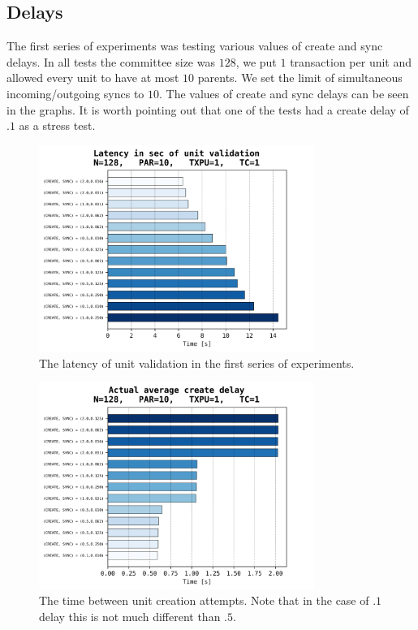 \documentclass[a4paper,10pt]{article}
\begin{document}
		\subsection{Delays}
		\FloatBarrier
			The first series of experiments was testing various values of create and sync delays.
			In all tests the committee size was $128$, we put $1$ transaction per unit and allowed every unit to have at most $10$ parents. We set the limit of simultaneous incoming/outgoing syncs to $10$.
			The values of create and sync delays can be seen in the graphs.
			It is worth pointing out that one of the tests had a create delay of $.1$ as a stress test.
			\begin{figure}[h]
				\centering
				\includegraphics[width=0.8\textwidth]{bar_plots/final_exp1/create_ord_del.png}
				\caption{The latency of unit validation in the first series of experiments.}
				\label{fig:delaysLatency}
			\end{figure}
			\begin{figure}[h]
				\centering
				\includegraphics[width=0.8\textwidth]{bar_plots/final_exp1/create_delay.png}
				\caption{The time between unit creation attempts. Note that in the case of $.1$ delay this is not much different than $.5$.}
				\label{fig:delaysCreateDelay}
			\end{figure}
\end{document}
